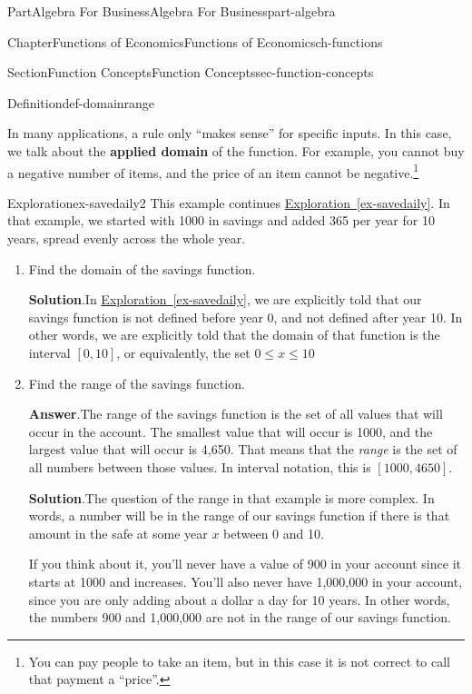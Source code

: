 \documentclass{tufte-book}
\newcommand{\blocktitlefont}{\relax}
\newcommand{\xreffont}{\relax}
\newcommand{\terminology}[1]{\textbf{#1}}
\numberwithin{equation}{chapter}
\begin{document}
\begin{partptx}{Part}{Algebra For Business}{}{Algebra For Business}{}{}{part-algebra}
\begin{chapterptx}{Chapter}{Functions of Economics}{}{Functions of Economics}{}{}{ch-functions}
\begin{sectionptx}{Section}{Function Concepts}{}{Function Concepts}{}{}{sec-function-concepts}
\begin{definition}{Definition}{}{def-domainrange}
\end{definition}
In many applications, a rule only ``makes sense'' for specific inputs. In this case, we talk about the \terminology{applied domain} of the function. For example, you cannot buy a negative number of items, and the price of an item cannot be negative.\footnote{You can pay people to take an item, but in this case it is not correct to call that payment a ``price''.\label{sec-function-concepts-9-3}}%
\begin{exploration}{Exploration}{}{ex-savedaily2}%
This example continues \hyperref[ex-savedaily]{Exploration~{\xreffont\ref{ex-savedaily}}}. In that example, we started with \textdollar{}1000 in savings and added \textdollar{}365 per year for 10 years, spread evenly across the whole year.%
\begin{enumerate}[font=\bfseries,label=(\alph*),ref=\alph*]%
\item{}Find the domain of the savings function.%
\par\smallskip%
\noindent\textbf{\blocktitlefont Solution}.\hypertarget{ex-savedaily2-2-2}{}\quad{}In \hyperref[ex-savedaily]{Exploration~{\xreffont\ref{ex-savedaily}}}, we are explicitly told that our savings function is not defined before year 0, and not defined after year 10. In other words, we are explicitly told that the domain of that function is the interval \([0,10]\), or equivalently, the set \(0\leq x \leq 10\)%
\item{}Find the range of the savings function.%
\par\smallskip%
\noindent\textbf{\blocktitlefont Answer}.\hypertarget{ex-savedaily2-3-2}{}\quad{}The range of the savings function is the set of all values that will occur in the account. The smallest value that will occur is \textdollar{}1000, and the largest value that will occur is \textdollar{}4,650.  That means that the \emph{range} is the set of all numbers between those values.  In interval notation, this is \([1000,4650]\).%
\par\smallskip%
\noindent\textbf{\blocktitlefont Solution}.\hypertarget{ex-savedaily2-3-3}{}\quad{}The question of the range in that example is more complex. In words, a number will be in the range of our savings function if there is that amount in the safe at some year \(x\) between 0 and 10.%
\par
If you think about it, you'll never have a value of \textdollar{}900 in your account since it starts at \textdollar{}1000 and increases. You'll also never have  \textdollar{}1,000,000 in your account, since you are only adding about a dollar a day for 10 years. In other words, the numbers 900 and \textdollar{}1,000,000 are not in the range of our savings function.%

\end{enumerate}
\end{exploration}
\end{sectionptx}
\end{chapterptx}
\end{partptx}
\end{document}
